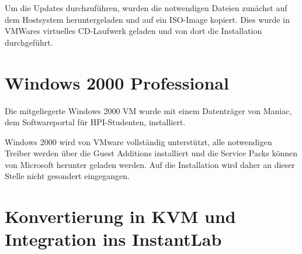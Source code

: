 	Um die Updates durchzuführen, wurden die notwendigen Dateien zunächst auf dem Hostsystem heruntergeladen und auf ein ISO-Image kopiert. Dies wurde in VMWares virtuelles CD-Laufwerk geladen und von dort die Installation durchgeführt.

\section{Windows 2000 Professional}

Die mitgeliegerte Windows 2000 VM wurde mit einem Datenträger von Maniac, dem Softwareportal für HPI-Studenten, installiert.

Windows 2000 wird von VMware vollständig unterstützt, alle notwendigen Treiber werden über die Guest Additions installiert und die Service Packs können von Microsoft herunter geladen werden.
Auf die Installation wird daher an dieser Stelle nicht gesondert eingegangen.



\section{Konvertierung in KVM und Integration ins InstantLab}
